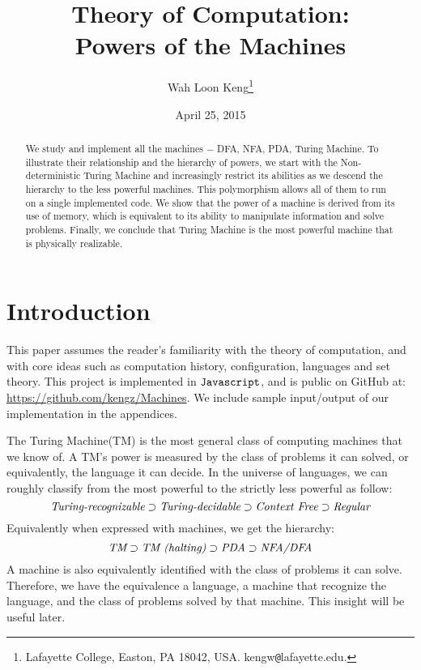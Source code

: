 \documentclass[12pt]{article}  %
\begin{document}
\title{Theory of Computation:\\ Powers of the Machines}

\author{
{Wah Loon Keng}\thanks{
Lafayette College,
Easton, PA 18042, USA.
kengw{\tt @}lafayette.edu.}
}
\date{April 25, 2015}
\maketitle

\begin{abstract}
We study and implement all the machines $-$ DFA, NFA, PDA, Turing Machine. To illustrate their relationship and the hierarchy of powers, we start with the Non-deterministic Turing Machine and increasingly restrict its abilities as we descend the hierarchy to the less powerful machines. This polymorphism allows all of them to run on a single implemented code. We show that the power of a machine is derived from its use of memory, which is equivalent to its ability to manipulate information and solve problems. Finally, we conclude that Turing Machine is the most powerful machine that is physically realizable.
\end{abstract}







\section{Introduction} \label{intro}


This paper assumes the reader's familiarity with the theory of computation, and with core ideas such as computation history, configuration, languages and set theory. This project is implemented in ${\tt Javascript}$, and is public on GitHub at: \url{https://github.com/kengz/Machines}. We include sample input/output of our implementation in the appendices.

The Turing Machine(TM) is the most general class of computing machines that we know of. A TM's power is measured by the class of problems it can solved, or equivalently, the language it can decide. In the universe of languages, we can roughly classify from the most powerful to the strictly less powerful as follow:
$$\emph{Turing-recognizable} \supset \emph{Turing-decidable} \supset \emph{Context Free} \supset \emph{Regular}$$
Equivalently when expressed with machines, we get the hierarchy:
$$\emph{TM} \supset \emph{TM (halting)} \supset \emph{PDA} \supset \emph{NFA/DFA}$$
A machine is also equivalently identified with the class of problems it can solve. Therefore, we have the equivalence a language, a machine that recognize the language, and the class of problems solved by that machine. This insight will be useful later.
\end{document}
